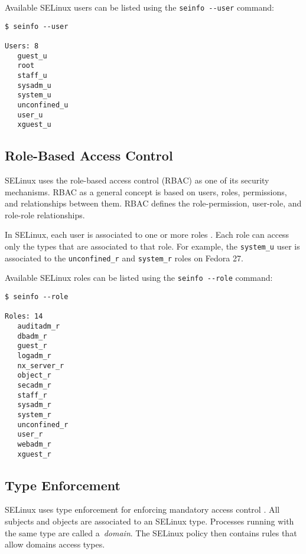 Available SELinux users can be listed using the \texttt{seinfo -{}-user}
command:
\begin{lstlisting}
$ seinfo --user

Users: 8
   guest_u
   root
   staff_u
   sysadm_u
   system_u
   unconfined_u
   user_u
   xguest_u
\end{lstlisting}

\subsection{Role-Based Access Control}
\label{rbac}
SELinux uses the role-based access control (RBAC) as one of its security
mechanisms. RBAC as a general concept is based on users, roles, permissions,
and relationships between them. RBAC defines the role-permission, user-role, and
role-role relationships.

In SELinux, each user is associated to one or more roles \cite[p.~24]{tsn}.
Each role can access only the types that are associated to that role. For
example, the \texttt{system\_u} user is associated to the
\texttt{unconfined\_r} and \texttt{system\_r} roles on Fedora 27.

Available SELinux roles can be listed using the \texttt{seinfo -{}-role}
command:
\begin{lstlisting}
$ seinfo --role

Roles: 14
   auditadm_r
   dbadm_r
   guest_r
   logadm_r
   nx_server_r
   object_r
   secadm_r
   staff_r
   sysadm_r
   system_r
   unconfined_r
   user_r
   webadm_r
   xguest_r
\end{lstlisting}

\subsection{Type Enforcement}
\label{te}
SELinux uses type enforcement for enforcing mandatory access control
\cite[pp.~25--26]{tsn}. All subjects and objects are associated to an SELinux
type. Processes running with the same type are called a~\emph{domain}. The
SELinux policy then contains rules that allow domains access types.

